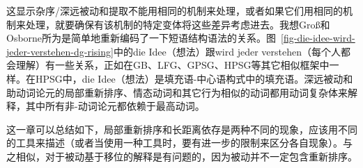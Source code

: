 \zl
这显示杂序/深远被动和提取不能用相同的机制来处理，或者如果它们用相同的机制来处理，就要确保有该机制的特定变体将这些差异考虑进去。我想Groß和Osborne所为是简单地重新编码了一下短语结构语法的关系。图~\ref{fig-die-idee-wird-jeder-verstehen-dg-rising}中的die Idee（想法）跟wird jeder verstehen（每个人都会理解）有一些关系，正如在GB、LFG、GPSG、HPSG等其它相似框架中一样。在HPSG中，die Idee（想法）是填充语-中心语构式中的填充语。深远被动和助动词论元的局部重新排序、情态动词和其它行为相似的动词都用动词复杂体来解释，其中所有非-动词论元都依赖于最高动词\citep{HN94a}。

这一章可以总结如下，局部重新排序和长距离依存是两种不同的现象，应该用不同的工具来描述（或者当使用一种工具时，要有进一步的限制来区分各自现象）。与之相似，对于被动基于移位的解释是有问题的，因为被动并不一定包含重新排序。


